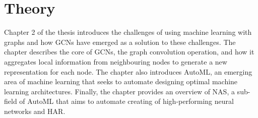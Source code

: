 \chapter{Theory}
\begin{comment}
This chapter will contain the essential theory for the thesis. 

As the authors did a literature review as a pre-study for this project, some subchapters will be re-used as the theory is still highly relevant for this thesis. 
\end{comment}
Chapter 2 of the thesis introduces the challenges of using machine learning with graphs and how \glspl{GCN} have emerged as a solution to these challenges. The chapter describes the core of \glspl{GCN}, the graph convolution operation, and how it aggregates local information from neighbouring nodes to generate a new representation for each node. The chapter also introduces \Gls{AutoML}, an emerging area of machine learning that seeks to automate designing optimal machine learning architectures. Finally, the chapter provides an overview of \gls{NAS}, a sub-field of \gls{AutoML} that aims to automate creating of high-performing neural networks and \gls{HAR}. 





 

